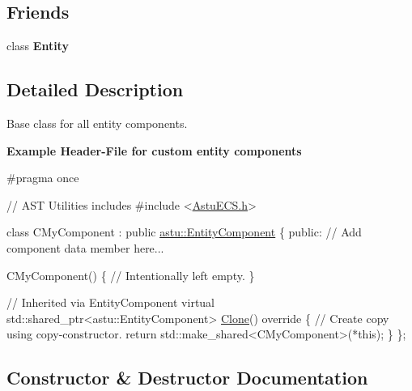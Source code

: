 \subsection*{Friends}
\begin{DoxyCompactItemize}
\item 
\mbox{\label{classastu_1_1EntityComponent_a614439ccac0344926adc4c0165d64060}} 
class {\bfseries Entity}
\end{DoxyCompactItemize}


\subsection{Detailed Description}
Base class for all entity components.

{\bfseries Example Header-\/\+File for custom entity components} 
\begin{DoxyCodeInclude}
\textcolor{preprocessor}{#pragma once}

\textcolor{comment}{// AST Utilities includes}
\textcolor{preprocessor}{#include <\hyperlink{AstuECS_8h}{AstuECS.h}>}

\textcolor{keyword}{class }CMyComponent : \textcolor{keyword}{public} \hyperlink{classastu_1_1EntityComponent}{astu::EntityComponent} \{
\textcolor{keyword}{public}: 
    \textcolor{comment}{// Add component data member here...}

    CMyComponent() \{
        \textcolor{comment}{// Intentionally left empty.        }
    \}

    \textcolor{comment}{// Inherited via EntityComponent}
    \textcolor{keyword}{virtual} std::shared\_ptr<astu::EntityComponent> \hyperlink{classastu_1_1EntityComponent_afeddb5a899d831255a9a4f07269f3b2d}{Clone}()\textcolor{keyword}{ override }\{
        \textcolor{comment}{// Create copy using copy-constructor.}
        \textcolor{keywordflow}{return} std::make\_shared<CMyComponent>(*this);
    \}    
\};
\end{DoxyCodeInclude}
 

\subsection{Constructor \& Destructor Documentation}
\mbox{\label{classastu_1_1EntityComponent_a9bb95d7ddc55093fd86e04d5b6aa98ec}} 
